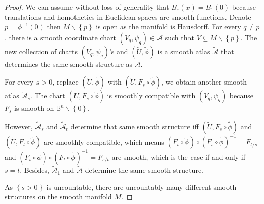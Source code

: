 \begin{proof}
    We can assume without loss of generality that \( B_{\varepsilon}(x) = B_{1}(0) \) because translations and homotheties in Euclidean spaces are smooth functions. Denote \( p = \phi^{-1}(0) \) then \( M \smallsetminus \left\{ p \right\} \) is open as the manifold is Hausdorff. For every \( q \ne p \), there is a smooth coordinate chart \( (V_{q}, \psi_{q}) \in \mathcal{A} \) such that \( V \subseteq M \smallsetminus \left\{ p \right\} \). The new collection of charts \( (V_{q}, \psi_{q}) \)'s and \( (\widetilde{U}, \widetilde{\phi}) \) is a smooth atlas \( \widetilde{\mathcal{A}} \) that determines the same smooth structure as \( \mathcal{A} \).

    For every \( s > 0 \), replace \( (\widetilde{U}, \widetilde{\phi}) \) with \( (\widetilde{U}, F_{s} \circ \widetilde{\phi}) \), we obtain another smooth atlas \( \widetilde{\mathcal{A}}_{s} \). The chart \( (\widetilde{U}, F_{s} \circ \widetilde{\phi}) \) is smoothly compatible with \( (V_{q}, \psi_{q}) \) because \( F_{s} \) is smooth on \( \mathbb{B}^{n} \smallsetminus \left\{0\right\} \).

    However, \( \widetilde{\mathcal{A}}_{s} \) and \( \widetilde{\mathcal{A}}_{t} \) determine that same smooth structure iff \( (\widetilde{U}, F_{s} \circ \widetilde{\phi}) \) and \( (\widetilde{U}, F_{t} \circ \widetilde{\phi}) \) are smoothly compatible, which means \( (F_{t} \circ \widetilde{\phi}) \circ {(F_{s} \circ \widetilde{\phi})}^{-1} = F_{t/s} \) and \( (F_{s} \circ \widetilde{\phi}) \circ {(F_{t} \circ \widetilde{\phi})}^{-1} = F_{s/t} \) are smooth, which is the case if and only if \( s = t \). Besides, \( \widetilde{\mathcal{A}}_{1} \) and \( \widetilde{\mathcal{A}} \) determine the same smooth structure.

    As \( \left\{ s > 0 \right\} \) is uncountable, there are uncountably many different smooth structures on the smooth manifold \( M \).
\end{proof}

